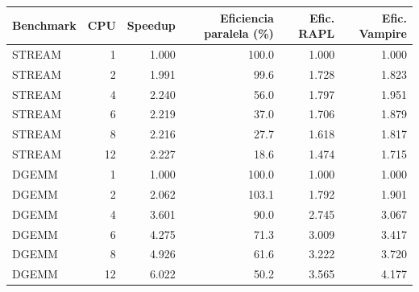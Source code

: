 \begin{tabular}{lrrrrr}
\hline
Benchmark & CPU & Speedup & Eficiencia paralela (\%) & Efic. RAPL & Efic. Vampire \\
\hline
STREAM & 1 & 1.000 & 100.0 & 1.000 & 1.000 \\
STREAM & 2 & 1.991 & 99.6 & 1.728 & 1.823 \\
STREAM & 4 & 2.240 & 56.0 & 1.797 & 1.951 \\
STREAM & 6 & 2.219 & 37.0 & 1.706 & 1.879 \\
STREAM & 8 & 2.216 & 27.7 & 1.618 & 1.817 \\
STREAM & 12 & 2.227 & 18.6 & 1.474 & 1.715 \\
DGEMM & 1 & 1.000 & 100.0 & 1.000 & 1.000 \\
DGEMM & 2 & 2.062 & 103.1 & 1.792 & 1.901 \\
DGEMM & 4 & 3.601 & 90.0 & 2.745 & 3.067 \\
DGEMM & 6 & 4.275 & 71.3 & 3.009 & 3.417 \\
DGEMM & 8 & 4.926 & 61.6 & 3.222 & 3.720 \\
DGEMM & 12 & 6.022 & 50.2 & 3.565 & 4.177 \\
\hline
\end{tabular}
